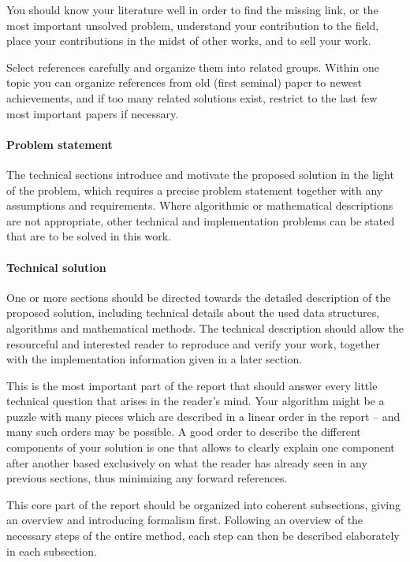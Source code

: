 \documentclass[11pt, a4paper,oneside,chapterprefix=false]{scrbook}
\begin{document}
You should know your literature well in order to find the missing link, or the most important unsolved problem, understand your contribution to the field, place your contributions in the midst of other works, and to sell your work.

Select references carefully and organize them into related groups. Within one topic you can organize references from old (first seminal) paper to newest achievements, and if too many related solutions exist, restrict to the last few most important papers if necessary.

\paragraph{Problem statement}

The technical sections introduce and motivate the proposed solution in the light of the problem, which requires a precise problem statement together with any assumptions and requirements. Where algorithmic or mathematical descriptions are not appropriate, other technical and implementation problems can be stated that are to be solved in this work.

\paragraph{Technical solution}

One or more sections should be directed towards the detailed description of the proposed solution, including technical details about the used data structures, algorithms and mathematical methods. The technical description should allow the resourceful and interested reader to reproduce and verify your work, together with the implementation information given in a later section.

This is the most important part of the report that should answer every little technical question that arises in the reader's mind. Your algorithm might be a puzzle with many pieces which are described in a linear order in the report -- and many such orders may be possible. A good order to describe the different components of your solution is one that allows to clearly explain one component after another based exclusively on what the reader has already seen in any previous sections, thus minimizing any forward references.

This core part of the report should be organized into coherent subsections, giving an overview and introducing formalism first. Following an overview of the necessary steps of the entire method, each step can then be described elaborately in each subsection.
\end{document}
